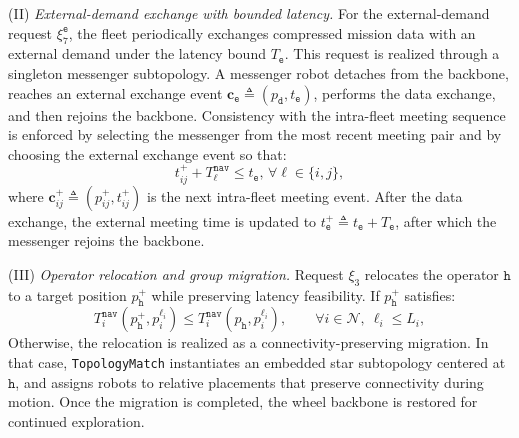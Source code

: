 (II) \emph{External-demand exchange with bounded latency.}
For the external-demand request \(\xi_7^{\texttt{e}}\), the fleet
periodically exchanges compressed mission data with an external demand
under the latency bound \(T_{\texttt{e}}\). This request is realized
through a singleton messenger subtopology. A messenger robot detaches
from the backbone, reaches an external exchange event
\(\mathbf{c}_{\texttt{e}}\triangleq(p_{\texttt{d}},t_{\texttt{e}})\),
performs the data exchange, and then rejoins the backbone.
Consistency with the intra-fleet meeting sequence is enforced by
selecting the messenger from the most recent meeting pair and by
choosing the external exchange event so that:
\begin{equation}
\label{ch05:eq:interteam_req}
t_{ij}^{+}+T_{\ell}^{\texttt{nav}}
\le t_{\texttt{e}}, \, \forall \ell\in\{i,j\},
\end{equation}
where \(\mathbf{c}_{ij}^{+}\triangleq(p_{ij}^{+},t_{ij}^{+})\) is the
next intra-fleet meeting event. After the data exchange, the external
meeting time is updated to
\(t_{\texttt{e}}^{+}\triangleq t_{\texttt{e}}+T_{\texttt{e}}\),
after which the messenger rejoins the backbone.

(III) \emph{Operator relocation and group migration.}
Request \(\xi_3\) relocates the operator \(\texttt{h}\) to a
target position \(p_{\texttt{h}}^{+}\) while preserving latency
feasibility. If \(p_{\texttt{h}}^{+}\) satisfies:
\begin{equation}
\label{ch05:eq:base-location}
T_i^{\texttt{nav}}(p_{\texttt{h}}^{+},p_i^{\ell_i})
\le
T_i^{\texttt{nav}}(p_{\texttt{h}},p_i^{\ell_i}),
\qquad
\forall i\in\mathcal{N},\ \ell_i\le L_i,
\end{equation}
 Otherwise, the relocation is realized as a
connectivity-preserving migration. In that case,
\texttt{TopologyMatch} instantiates an embedded star subtopology centered at
\(\texttt{h}\), and assigns robots to relative placements that
preserve connectivity during motion. Once the migration is completed,
the wheel backbone is restored for continued exploration.

